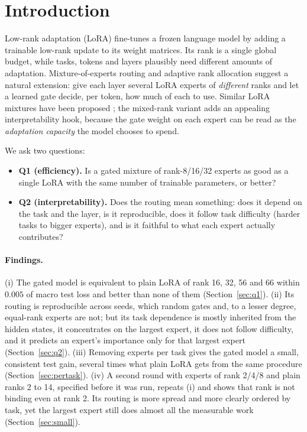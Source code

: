 \documentclass[11pt]{article}
\begin{document}
\section{Introduction}
Low-rank adaptation (LoRA) \citep{hu2022lora} fine-tunes a frozen language model by adding a
trainable low-rank update to its weight matrices. Its rank is a single global budget, while
tasks, tokens and layers plausibly need different amounts of adaptation. Mixture-of-experts
routing \citep{shazeer2017moe,fedus2022switch} and adaptive rank allocation
\citep{zhang2023adalora} suggest a natural extension: give each layer several LoRA experts of
\emph{different} ranks and let a learned gate decide, per token, how much of each to use. Similar
LoRA mixtures have been proposed \citep{dou2023loramoe,wu2024mole}; the mixed-rank variant adds an
appealing interpretability hook, because the gate weight on each expert can be read as the
\emph{adaptation capacity} the model chooses to spend.

We ask two questions:
\begin{itemize}
  \item \textbf{Q1 (efficiency).} Is a gated mixture of rank-8/16/32 experts as good as a single
        LoRA with the same number of trainable parameters, or better?
  \item \textbf{Q2 (interpretability).} Does the routing mean something: does it depend on the
        task and the layer, is it reproducible, does it follow task difficulty (harder tasks to
        bigger experts), and is it faithful to what each expert actually contributes?
\end{itemize}

\paragraph{Findings.} (i) The gated model is equivalent to plain LoRA of rank 16, 32, 56 and 66
within $0.005$ of macro test loss and better than none of them (Section~\ref{sec:q1}). (ii) Its
routing is reproducible across seeds, which random gates and, to a lesser degree, equal-rank
experts are not; but its task dependence is mostly inherited from the hidden states, it
concentrates on the largest expert, it does not follow difficulty, and it predicts an expert's
importance only for that largest expert (Section~\ref{sec:q2}). (iii) Removing experts per task
gives the gated model a small, consistent test gain, several times what plain LoRA gets from the
same procedure (Section~\ref{sec:pertask}). (iv) A second round with experts of rank 2/4/8 and plain
ranks 2 to 14, specified before it was run, repeats (i) and shows that rank is not binding even
at rank 2. Its routing is more spread and more clearly ordered by task, yet the largest expert
still does almost all the measurable work (Section~\ref{sec:small}).
\end{document}
